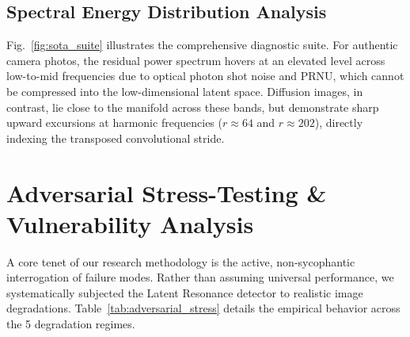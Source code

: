 \documentclass[conference]{IEEEtran}
\theoremstyle{definition}
\begin{document}
\subsection{Spectral Energy Distribution Analysis}
Fig.~\ref{fig:sota_suite} illustrates the comprehensive diagnostic suite. For authentic camera photos, the residual power spectrum hovers at an elevated level across low-to-mid frequencies due to optical photon shot noise and PRNU, which cannot be compressed into the low-dimensional latent space. Diffusion images, in contrast, lie close to the manifold across these bands, but demonstrate sharp upward excursions at harmonic frequencies ($r \approx 64$ and $r \approx 202$), directly indexing the transposed convolutional stride.

\section{Adversarial Stress-Testing \& Vulnerability Analysis}

A core tenet of our research methodology is the active, non-sycophantic interrogation of failure modes. Rather than assuming universal performance, we systematically subjected the Latent Resonance detector to realistic image degradations. Table~\ref{tab:adversarial_stress} details the empirical behavior across the 5 degradation regimes.

\begin{table}[t]
\caption{Adversarial Perturbation Stress-Test Results}
\label{tab:adversarial_stress}
\centering
\footnotesize
\setlength{\tabcolsep}{3pt}
\end{table}
\end{document}
